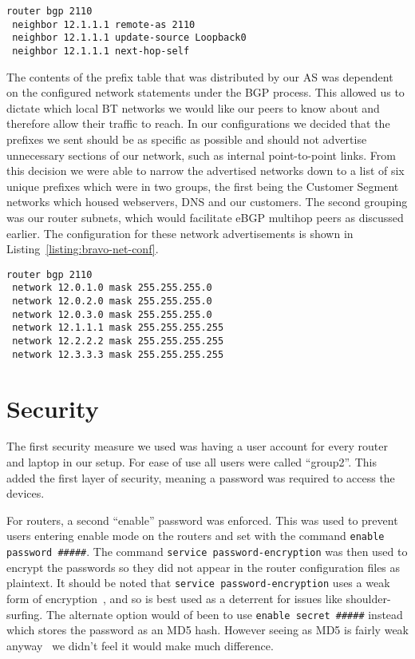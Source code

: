 \begin{lstlisting}[caption={Bravo-Alpha iBGP Configuration}, label={listing:bravo-ibgp-conf}]
router bgp 2110
 neighbor 12.1.1.1 remote-as 2110
 neighbor 12.1.1.1 update-source Loopback0
 neighbor 12.1.1.1 next-hop-self
\end{lstlisting}

The contents of the prefix table that was distributed by our AS was dependent
on the configured network statements under the BGP process. This allowed us to
dictate which local BT networks we would like our peers to know about and
therefore allow their traffic to reach. In our configurations we decided that
the prefixes we sent should be as specific as possible and should not advertise
unnecessary sections of our network, such as internal point-to-point links.
From this decision we were able to narrow the advertised networks down to a
list of six unique prefixes which were in two groups, the first being the
Customer Segment networks which housed webservers, DNS and our customers. The
second grouping was our router subnets, which would facilitate eBGP multihop
peers as discussed earlier. The configuration for these network advertisements
is shown in Listing~\ref{listing:bravo-net-conf}.

\begin{lstlisting}[caption={Bravo BGP Network Configuration}, label={listing:bravo-net-conf}]
router bgp 2110
 network 12.0.1.0 mask 255.255.255.0
 network 12.0.2.0 mask 255.255.255.0
 network 12.0.3.0 mask 255.255.255.0
 network 12.1.1.1 mask 255.255.255.255
 network 12.2.2.2 mask 255.255.255.255
 network 12.3.3.3 mask 255.255.255.255
\end{lstlisting}

\section{Security}
The first security measure we used was having a user account for every router
and laptop in our setup. For ease of use all users were called ``group2''. This
added the first layer of security, meaning a password was required to access
the devices.

For routers, a second ``enable'' password was enforced. This was used to
prevent users entering enable mode on the routers and set with the command
\texttt{enable password \#\#\#\#\#}. The command \texttt{service password-encryption}
was then used to encrypt the passwords so they did not appear in
the router configuration files as plaintext. It should be noted that
\texttt{service password-encryption} uses a weak form of
encryption~\cite{ciscocracker}, and so is best used as a deterrent for issues
like shoulder-surfing. The alternate option would of been to use
\texttt{enable secret \#\#\#\#\#} instead which stores the password as an MD5
hash. However seeing as MD5 is fairly weak anyway~\cite{md5} we didn't feel it
would make much difference.

